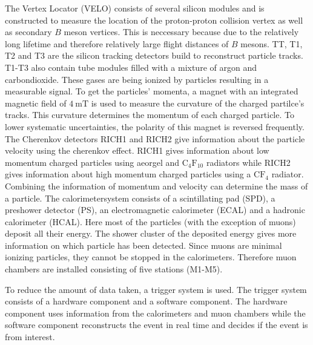 The Vertex Locator (VELO) consists of several silicon modules and is constructed to measure the location of the proton-proton collision vertex as well as secondary $B$ meson vertices.
This is neccessary because due to the relatively long lifetime and therefore relatively large flight distances of $B$ mesons.
TT, T1, T2 and T3 are the silicon tracking detectors build to reconstruct particle tracks.
T1-T3 also contain tube modules filled with a mixture of argon and carbondioxide.
These gases are being ionized by particles resulting in a measurable signal.
To get the particles' momenta, a magnet with an integrated magnetic field of $\SI{4}{\milli\tesla}$ is used to measure the curvature of the charged partilce's tracks.
This curvature determines the momentum of each charged particle.
To lower systematic uncertainties, the polarity of this magnet is reversed frequently.
The Cherenkov detectors RICH1 and RICH2 give information about the particle velocity using the cherenkov effect.
RICH1 gives information about low momentum charged particles using aeorgel and $\text{C}_4\text{F}_{10}$ radiators while RICH2 gives information about high momentum charged particles using a $\text{CF}_4$ radiator.
Combining the information of momentum and velocity can determine the mass of a particle.
The calorimetersystem consists of a scintillating pad (SPD), a preshower detector (PS), an electromagnetic calorimeter (ECAL) and a hadronic calorimeter (HCAL).
Here most of the particles (with the exception of muons) deposit all their energy.
The shower cluster of the deposited energy gives more information on which particle has been detected.
Since muons are minimal ionizing particles, they cannot be stopped in the calorimeters.
Therefore muon chambers are installed consisting of five stations (M1-M5).


To reduce the amount of data taken, a trigger system is used.
The trigger system consists of a hardware component and a software component.
The hardware component uses information from the calorimeters and muon chambers while the software component reconstructs the event in real time and decides if the event is from interest.
